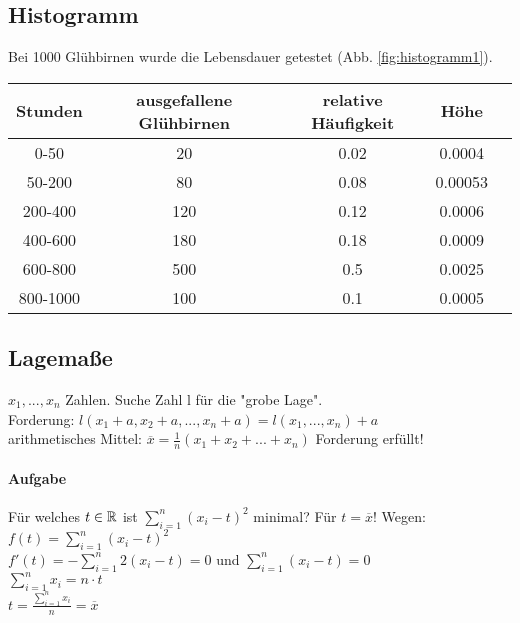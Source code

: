 
\subsection{Histogramm}

Bei 1000 Glühbirnen wurde die Lebensdauer getestet (Abb. \ref{fig:histogramm1}).\\ %
\begin{tabular}{|c|c|c|c|c|}
\hline Stunden & ausgefallene Glühbirnen & relative Häufigkeit & Höhe \\ 
\hline 0-50 & 20 & 0.02 & 0.0004 \\ 
\hline 50-200 & 80 & 0.08 & 0.00053 \\ 
\hline 200-400 & 120 & 0.12 & 0.0006 \\ 
\hline 400-600 & 180 & 0.18 & 0.0009 \\ 
\hline 600-800 & 500 & 0.5 & 0.0025 \\ 
\hline 800-1000 & 100 & 0.1 & 0.0005 \\ 
\hline 
\end{tabular} 

\subsection{Lagemaße}
$ x_1, ..., x_n $ Zahlen. Suche Zahl l für die "grobe Lage".\\
Forderung: $ l(x_1+a, x_2+a, ..., x_n+a) = l(x_1, ..., x_n) + a $\\
arithmetisches Mittel: $ \overline{x} = \frac{1}{n}(x_1+x_2+...+x_n) $ Forderung erfüllt!
\paragraph{Aufgabe} Für welches $t\in \mathbb{R}$ ist $ \sum_{i=1}^{n}(x_i-t)^2 $ minimal? Für $t=\overline{x}$! Wegen: $ f(t)=\sum_{i=1}^{n}(x_i-t)^2 $\\
$ f'(t) = -\sum_{i=1}^{n}2(x_i-t) = 0 $ und $ \sum_{i=1}^{n}(x_i-t) = 0 $\\
$ \sum_{i=1}^{n} x_i = n\cdot t $\\
$ t = \frac{\sum_{i=1}^{n}x_i}{n} = \overline{x} $

